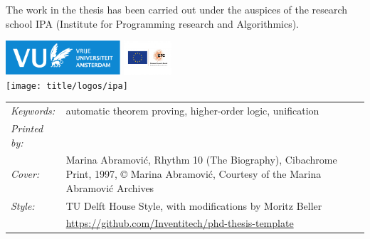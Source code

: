 \begin{titlepage}


\newpage
\noindent The work in the thesis has been carried out under the auspices of the research school IPA
(Institute for Programming research and Algorithmics).

\medskip
\vfill
\begin{center}
    \includegraphics[height=0.5in]{title/logos/vulogo}
    \hspace{2em}
    \includegraphics[height=0.5in]{title/logos/erclogo}
    \\ \vspace{0.5cm}
    \texttt{[image: title/logos/ipa]}
\end{center}
\vfill

\noindent
\begin{tabular}{@{}p{}@{}p{}}
  \textit{Keywords:} & automatic theorem proving, higher-order logic, unification  \\[\medskipamount]
      \textit{Printed by:} &  \\[\medskipamount]
      \textit{Cover:} &  Marina Abramović, Rhythm 10 (The Biography), Cibachrome Print,
                         1997, © Marina Abramović,
                         Courtesy of the Marina Abramović Archives \\[\medskipamount]
      \textit{Style:} & TU Delft House Style, with modifications by Moritz Beller \\& \url{https://github.com/Inventitech/phd-thesis-template} \\[\medskipamount]
\end{tabular}


\end{titlepage}
